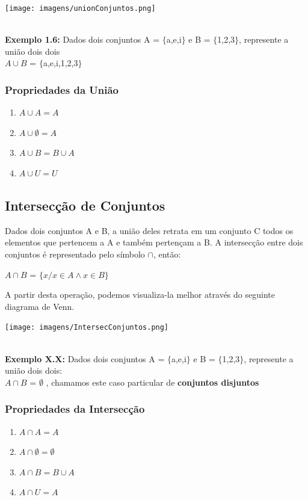 \documentclass[a4paper,12pt,twoside,BCOR=10mm]{scrbook}
\begin{document}
\begin{titlepage}
\begin{center}
	\texttt{[image: imagens/unionConjuntos.png]}
\end{center}

\\
\textbf{Exemplo 1.6:} Dados dois conjuntos A = $\{$a,e,i$\}$ e B = $\{$1,2,3$\}$, represente a união dois dois
\\
$A \cup B$ = $\{$a,e,i,1,2,3$\}$

\subsubsection{Propriedades da União}
\begin{enumerate}
\item $A \cup A = A$
\item $A \cup \emptyset = A$
\item $A \cup B = B \cup A$
\item $A \cup U = U$
\end{enumerate}
\subsection{Intersecção de Conjuntos}
Dados dois conjuntos A e B, a união deles retrata em um conjunto C todos os elementos que pertencem a A e também pertençam a B. A intersecção entre dois conjuntos é representado pelo símbolo $\cap$, então:\\
\begin{center}
$A \cap B$ = $\{x/ x \in A \wedge x \in B \}$
\end{center}
A partir desta operação, podemos visualiza-la melhor através do seguinte diagrama de Venn.

\begin{center}
	\texttt{[image: imagens/IntersecConjuntos.png]}
\end{center}
\\
\textbf{Exemplo X.X:} Dados dois conjuntos A = $\{$a,e,i$\}$ e B = $\{$1,2,3$\}$, represente a união dois dois:
\\
$A \cap B$ = $\emptyset$ , chamamos este caso particular de \textbf{conjuntos disjuntos}

\subsubsection{Propriedades da Intersecção}
\begin{enumerate}
\item $A \cap A = A$
\item $A \cap \emptyset = \emptyset$
\item $A \cap B = B \cup A$
\item $A \cap U = A$
\end{enumerate}

\end{titlepage}
\end{document}
